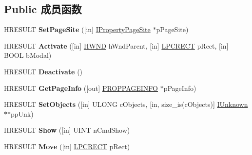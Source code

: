 \subsection*{Public 成员函数}
\begin{DoxyCompactItemize}
\item 
\mbox{\label{interface_i_property_page_ad0b793833ffb56a97afc09436c169115}} 
H\+R\+E\+S\+U\+LT {\bfseries Set\+Page\+Site} (\mbox{[}in\mbox{]} \hyperlink{interface_i_property_page_site}{I\+Property\+Page\+Site} $\ast$p\+Page\+Site)
\item 
\mbox{\label{interface_i_property_page_a063dde733875e3306856fd3da738a74c}} 
H\+R\+E\+S\+U\+LT {\bfseries Activate} (\mbox{[}in\mbox{]} \hyperlink{interfacevoid}{H\+W\+ND} h\+Wnd\+Parent, \mbox{[}in\mbox{]} \hyperlink{structtag_r_e_c_t}{L\+P\+C\+R\+E\+CT} p\+Rect, \mbox{[}in\mbox{]} B\+O\+OL b\+Modal)
\item 
\mbox{\label{interface_i_property_page_ad16f829e9b5c7c3d9f7914dd7b62c0b5}} 
H\+R\+E\+S\+U\+LT {\bfseries Deactivate} ()
\item 
\mbox{\label{interface_i_property_page_a25917d8409efb092eab8fe4120d45ba1}} 
H\+R\+E\+S\+U\+LT {\bfseries Get\+Page\+Info} (\mbox{[}out\mbox{]} \hyperlink{struct_i_property_page_1_1tag_p_r_o_p_p_a_g_e_i_n_f_o}{P\+R\+O\+P\+P\+A\+G\+E\+I\+N\+FO} $\ast$p\+Page\+Info)
\item 
\mbox{\label{interface_i_property_page_a98e2b0998c780b671ade9a06c5772f89}} 
H\+R\+E\+S\+U\+LT {\bfseries Set\+Objects} (\mbox{[}in\mbox{]} U\+L\+O\+NG c\+Objects, \mbox{[}in, size\+\_\+is(c\+Objects)\mbox{]} \hyperlink{interface_i_unknown}{I\+Unknown} $\ast$$\ast$pp\+Unk)
\item 
\mbox{\label{interface_i_property_page_ad818419d63491fc45cbffbec424e2b39}} 
H\+R\+E\+S\+U\+LT {\bfseries Show} (\mbox{[}in\mbox{]} U\+I\+NT n\+Cmd\+Show)
\item 
\mbox{\label{interface_i_property_page_a13a97300a7e8a1eec53d41bb2d493d07}} 
H\+R\+E\+S\+U\+LT {\bfseries Move} (\mbox{[}in\mbox{]} \hyperlink{structtag_r_e_c_t}{L\+P\+C\+R\+E\+CT} p\+Rect)
$$
\end{DoxyCompactItemize}
